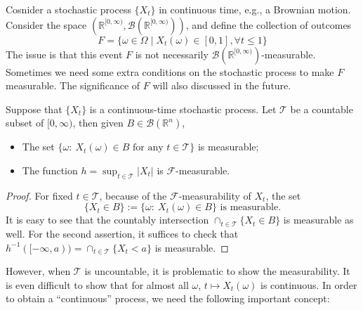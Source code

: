 \begin{remark}
Cosnider a stochastic process $\{X_t\}$ in continuous time, e.g., a Brownian motion.
Consider the space $(\mathbb{R}^{[0,\infty)},\mathcal{B}(\mathbb{R}^{[0,\infty)}))$, and define the collection of outcomes
\[
F=\{\omega\in\Omega\mid X_t(\omega)\in[0,1],\forall t\le1\}
\]
The issue is that this event $F$ is not necessarily $\mathcal{B}(\mathbb{R}^{[0,\infty)})$-measurable.
Sometimes we need some extra conditions on the stochastic process to make $F$ measurable.
The significance of $F$ will also discussed in the future.
%
%
%
\end{remark}

\begin{proposition}
Suppose that $\{X_t\}$ is a continuous-time stochastic process.
Let $\mathcal{T}$ be a countable subset of $[0,\infty)$, then given $B\in\mathcal{B}(\mathbb{R}^n)$,
\begin{itemize}
\item
The set $\{\omega:~
X_t(\omega)\in B
\text{ for any } t\in\mathcal{T}\}$ is measurable;
\item
The function $h=\sup_{t\in\mathcal{T}}|X_t|$ is $\mathcal{F}$-measurable.
\end{itemize}
\end{proposition}
\begin{proof}
For fixed $t\in\mathcal{T}$, because of the $\mathcal{F}$-measurability of $X_t$, the set
\[
\{X_t\in B\}:=\{\omega:~
X_t(\omega)\in B
\}\text{ is measurable}.
\]
It is easy to see that the countably intersection $\cap_{t\in\mathcal{T}}\{X_t\in B\}$ is measurable as well.
For the second assertion, it suffices to check that $h^{-1}([-\infty,a))=\cap_{t\in\mathcal{T}}\{X_t<a\}$ is measurable.
\end{proof}
However, when $\mathcal{T}$ is uncountable, it is problematic to show the measurability.
It is even difficult to show that for almost all $\omega$, $t\mapsto X_t(\omega)$ is continuous.
In order to obtain a ``continuous'' process, we need the following important concept:


